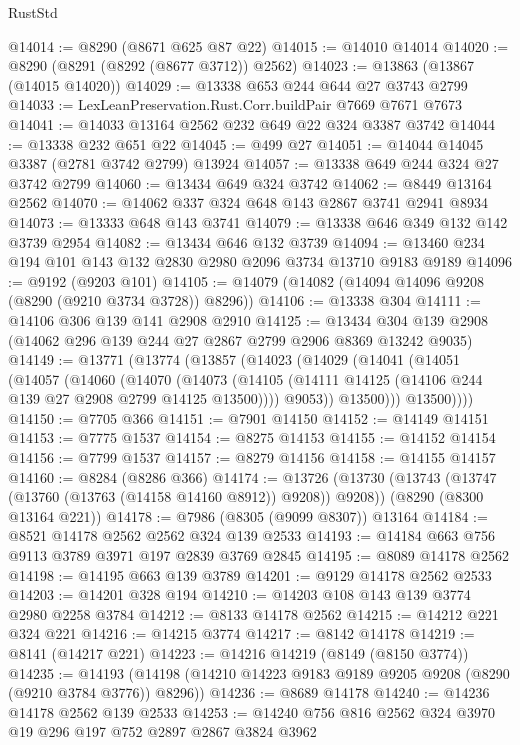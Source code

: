 \begin{lexlean}{RustStd}
\begin{coremodule}
@14014 := @8290 (@8671 @625 @87 @22)
@14015 := @14010 @14014
@14020 := @8290 (@8291 (@8292 (@8677 @3712)) @2562)
@14023 := @13863 (@13867 (@14015 @14020))
@14029 := @13338 @653 @244 @644 @27 @3743 @2799
@14033 := LexLeanPreservation.Rust.Corr.buildPair @7669 @7671 @7673
@14041 := @14033 @13164 @2562 @232 @649 @22 @324 @3387 @3742
@14044 := @13338 @232 @651 @22
@14045 := @499 @27
@14051 := @14044 @14045 @3387 (@2781 @3742 @2799) @13924
@14057 := @13338 @649 @244 @324 @27 @3742 @2799
@14060 := @13434 @649 @324 @3742
@14062 := @8449 @13164 @2562
@14070 := @14062 @337 @324 @648 @143 @2867 @3741 @2941 @8934
@14073 := @13333 @648 @143 @3741
@14079 := @13338 @646 @349 @132 @142 @3739 @2954
@14082 := @13434 @646 @132 @3739
@14094 := @13460 @234 @194 @101 @143 @132 @2830 @2980 @2096 @3734 @13710 @9183 @9189
@14096 := @9192 (@9203 @101)
@14105 := @14079 (@14082 (@14094 @14096 @9208 (@8290 (@9210 @3734 @3728)) @8296))
@14106 := @13338 @304
@14111 := @14106 @306 @139 @141 @2908 @2910
@14125 := @13434 @304 @139 @2908 (@14062 @296 @139 @244 @27 @2867 @2799 @2906 @8369 @13242 @9035)
@14149 := @13771
    (@13774
      (@13857
        (@14023
          (@14029
            (@14041
              (@14051
                (@14057
                  (@14060
                    (@14070
                      (@14073
                        (@14105 (@14111 @14125 (@14106 @244 @139 @27 @2908 @2799 @14125 @13500))))
                      @9053))
                  @13500)))
            @13500))))
@14150 := @7705 @366
@14151 := @7901 @14150
@14152 := @14149 @14151
@14153 := @7775 @1537
@14154 := @8275 @14153
@14155 := @14152 @14154
@14156 := @7799 @1537
@14157 := @8279 @14156
@14158 := @14155 @14157
@14160 := @8284 (@8286 @366)
@14174 := @13726
    (@13730 (@13743 (@13747 (@13760 (@13763 (@14158 @14160 @8912)) @9208)) @9208))
    (@8290 (@8300 @13164 @221))
@14178 := @7986 (@8305 (@9099 @8307)) @13164
@14184 := @8521 @14178 @2562 @2562 @324 @139 @2533
@14193 := @14184 @663 @756 @9113 @3789 @3971 @197 @2839 @3769 @2845
@14195 := @8089 @14178 @2562
@14198 := @14195 @663 @139 @3789
@14201 := @9129 @14178 @2562 @2533
@14203 := @14201 @328 @194
@14210 := @14203 @108 @143 @139 @3774 @2980 @2258 @3784
@14212 := @8133 @14178 @2562
@14215 := @14212 @221 @324 @221
@14216 := @14215 @3774
@14217 := @8142 @14178
@14219 := @8141 (@14217 @221)
@14223 := @14216 @14219 (@8149 (@8150 @3774))
@14235 := @14193 (@14198 (@14210 @14223 @9183 @9189 @9205 @9208 (@8290 (@9210 @3784 @3776)) @8296))
@14236 := @8689 @14178
@14240 := @14236 @14178 @2562 @139 @2533
@14253 := @14240 @756 @816 @2562 @324 @3970 @19 @296 @197 @752 @2897 @2867 @3824 @3962

\end{coremodule}
\end{lexlean}
